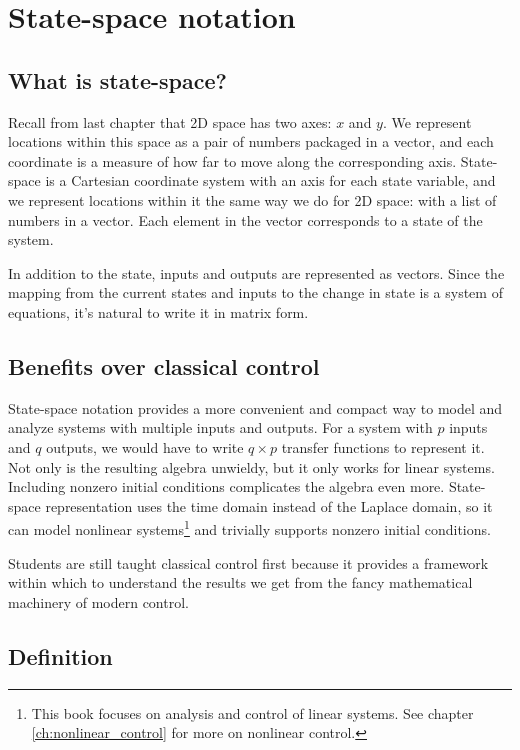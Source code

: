 \section{State-space notation}

\subsection{What is state-space?}

Recall from last chapter that 2D space has two axes: $x$ and $y$. We represent
locations within this space as a pair of numbers packaged in a vector, and each
coordinate is a measure of how far to move along the corresponding axis.
State-space is a Cartesian coordinate system with an axis for each \gls{state}
variable, and we represent locations within it the same way we do for 2D space:
with a list of numbers in a vector. Each element in the vector corresponds to a
\gls{state} of the \gls{system}.

In addition to the \gls{state}, \glspl{input} and \glspl{output} are represented
as vectors. Since the mapping from the current \glspl{state} and \glspl{input}
to the change in \gls{state} is a system of equations, it's natural to write it
in matrix form.

\subsection{Benefits over classical control}

State-space notation provides a more convenient and compact way to model and
analyze \glspl{system} with multiple \glspl{input} and \glspl{output}. For a
\gls{system} with $p$ \glspl{input} and $q$ \glspl{output}, we would have to
write $q \times p$ transfer functions to represent it. Not only is the resulting
algebra unwieldy, but it only works for linear \glspl{system}. Including nonzero
initial conditions complicates the algebra even more. State-space representation
uses the time domain instead of the Laplace domain, so it can model nonlinear
\glspl{system}\footnote{This book focuses on analysis and control of linear
\glspl{system}. See chapter \ref{ch:nonlinear_control} for more on nonlinear
control.} and trivially supports nonzero initial conditions.

Students are still taught classical control first because it provides a
framework within which to understand the results we get from the fancy
mathematical machinery of modern control.

\subsection{Definition}

